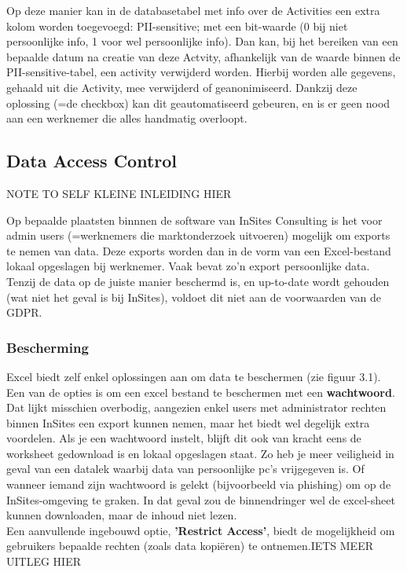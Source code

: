 Op deze manier kan in de databasetabel met info over de Activities een extra kolom worden toegevoegd: PII-sensitive; met een bit-waarde (0 bij niet persoonlijke info, 1 voor wel persoonlijke info). 
Dan kan, bij het bereiken van een bepaalde datum na creatie van deze Actvity, afhankelijk van de waarde binnen de PII-sensitive-tabel, een activity verwijderd worden. Hierbij worden alle gegevens, gehaald uit die Activity, mee verwijderd of geanonimiseerd. Dankzij deze oplossing (=de checkbox) kan dit geautomatiseerd gebeuren, en is er geen nood aan een werknemer die alles handmatig overloopt. 

\subsection{Data Access Control}
NOTE TO SELF KLEINE INLEIDING HIER 


Op bepaalde plaatsten binnnen de software van InSites Consulting is het voor admin users (=werknemers die marktonderzoek uitvoeren) mogelijk om exports te nemen van data. Deze exports worden dan in de vorm van een Excel-bestand lokaal opgeslagen bij werknemer.
Vaak bevat zo'n export persoonlijke data. Tenzij de data op de juiste manier beschermd is, en up-to-date wordt gehouden (wat niet het geval is bij InSites), voldoet dit niet aan de voorwaarden van de GDPR. 

\subsubsection{Bescherming}
Excel biedt zelf enkel oplossingen aan om data te beschermen (zie figuur 3.1). Een van de opties is om een excel bestand te beschermen met een \textbf{wachtwoord}. Dat lijkt misschien overbodig, aangezien enkel users met administrator rechten binnen InSites een export kunnen nemen, maar het biedt wel degelijk extra voordelen. Als je een wachtwoord instelt, blijft dit ook van kracht eens de worksheet gedownload is en lokaal opgeslagen staat. Zo heb je meer veiligheid in geval van een datalek waarbij data van persoonlijke pc's vrijgegeven is. Of wanneer iemand zijn wachtwoord is gelekt (bijvoorbeeld via phishing) om op de InSites-omgeving te graken. In dat geval zou de binnendringer wel de excel-sheet kunnen downloaden, maar de inhoud niet lezen. \\

Een aanvullende ingebouwd optie, \textbf{'Restrict Access'}, biedt de mogelijkheid om gebruikers bepaalde rechten (zoals data kopiëren) te ontnemen.IETS  MEER UITLEG HIER


